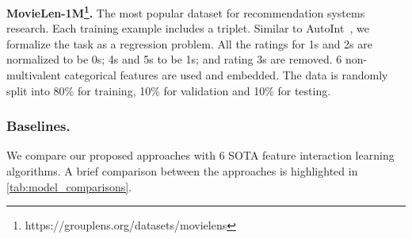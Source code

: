 \documentclass[sigconf]{acmart}
\begin{document}
{\bf MovieLen-1M\footnote{https://grouplens.org/datasets/movielens}.} The most popular dataset for recommendation systems research. Each training example includes a {} triplet. Similar to AutoInt~\cite{song2019autoint}, we formalize the task as a regression problem. All the ratings for 1s and 2s are normalized to be 0s; 4s and 5s to be 1s; and rating 3s are removed. 6 non-multivalent categorical features are used and embedded. The data is randomly split into 80\% for training, 10\% for validation and 10\% for testing.

\subsubsection{Baselines.}
\label{sec:baselines}
We compare our proposed approaches with 6 SOTA feature interaction learning algorithms. A brief comparison between the approaches is highlighted in \autoref{tab:model_comparisons}.
\end{document}
